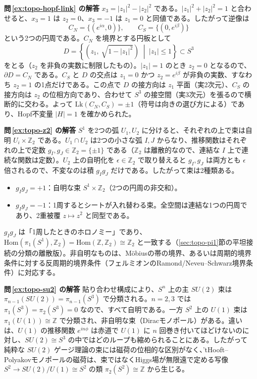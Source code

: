 \documentclass[uplatex, dvipdfmx, book]{jsbook}
\newcommand{\exsol}[1]{\par\medskip\noindent\textbf{問\,\ref{#1} の解答}\quad}
\begin{document}
\exsol{ex:topo-hopf-link}
$x_3 = |z_1|^2 - |z_2|^2$ である。$|z_1|^2 + |z_2|^2 = 1$ と合わせると、$x_3 = 1$ は $z_2 = 0$、$x_3 = -1$ は $z_1 = 0$ と同値である。したがって逆像は
\begin{equation*}
    C_N = \{ (e^{i\alpha}, 0) \}, \qquad C_S = \{ (0, e^{i\beta}) \}
\end{equation*}
という2つの円周である。$C_N$ を境界とする円板として
\begin{equation*}
    D = \left\{ \left( z_1,\ \sqrt{1 - |z_1|^2} \right) \;\middle|\; |z_1| \le 1 \right\} \subset S^3
\end{equation*}
をとる（$z_2$ を非負の実数に制限したもの）。$|z_1| = 1$ のとき $z_2 = 0$ となるので、$\partial D = C_N$ である。$C_S$ と $D$ の交点は $z_1 = 0$ かつ $z_2 = e^{i\beta}$ が非負の実数、すなわち $z_2 = 1$ の1点だけである。この点で $D$ の接方向は $z_1$ 平面（実2次元）、$C_S$ の接方向は $z_2$ の位相方向であり、合わせて $S^3$ の接空間（実3次元）を張るので横断的に交わる。よって $\mathrm{Lk}(C_N, C_S) = \pm 1$（符号は向きの選び方による）であり、Hopf不変量 $|H| = 1$ を確かめられた。

\exsol{ex:topo-z2}
$S^1$ を2つの弧 $U_1, U_2$ に分けると、それぞれの上で束は自明 $U_i \times \mathbb{Z}_2$ である。$U_1 \cap U_2$ は2つの小さな弧 $I, J$ からなり、推移関数はそれぞれの上で定数 $g_I, g_J \in \mathbb{Z}_2 = \{\pm 1\}$ である（$\mathbb{Z}_2$ は離散的なので、連結な $I$ 上で連続な関数は定数）。$U_2$ 上の自明化を $\epsilon \in \mathbb{Z}_2$ で取り替えると $g_I, g_J$ は両方とも $\epsilon$ 倍されるので、不変なのは積 $g_I g_J$ だけである。したがって束は2種類ある。
\begin{itemize}
    \item $g_I g_J = +1$：自明な束 $S^1 \times \mathbb{Z}_2$（2つの円周の非交和）。
    \item $g_I g_J = -1$：1周するとシートが入れ替わる束。全空間は連結な1つの円周であり、2重被覆 $z \mapsto z^2$ と同型である。
\end{itemize}
$g_I g_J$ は「1周したときのホロノミー」であり、$\mathrm{Hom}(\pi_1(S^1), \mathbb{Z}_2) = \mathrm{Hom}(\mathbb{Z}, \mathbb{Z}_2) \cong \mathbb{Z}_2$ と一致する（\ref{sec:topo-pi1}節の平坦接続の分類の離散版）。非自明なものは、Möbiusの帯の境界、あるいは周期的境界条件に対する反周期的境界条件（フェルミオンのRamond/Neveu--Schwarz境界条件）に対応する。

\exsol{ex:topo-su2}
貼り合わせ構成により、$S^n$ 上の主 $SU(2)$ 束は $\pi_{n-1}(SU(2)) = \pi_{n-1}(S^3)$ で分類される。$n = 2, 3$ では $\pi_1(S^3) = \pi_2(S^3) = 0$ なので、すべて自明である。一方 $S^2$ 上の $U(1)$ 束は $\pi_1(U(1)) \cong \mathbb{Z}$ で分類され、非自明な束（Diracモノポール）がある。違いは、$U(1)$ の推移関数 $e^{in\phi}$ は赤道で $U(1)$ に $n$ 回巻き付いてほどけないのに対し、$SU(2) \cong S^3$ の中ではどのループも縮められることにある。したがって純粋な $SU(2)$ ゲージ理論の束には磁荷の位相的な区別がなく、'tHooft--Polyakovモノポールの磁荷は、束ではなくHiggs場が無限遠で定める写像 $S^2 \to SU(2)/U(1) \cong S^2$ の類 $\pi_2(S^2) \cong \mathbb{Z}$ から生じる。
\end{document}
